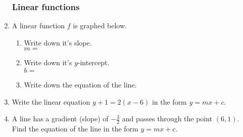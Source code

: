 \documentclass[12pt, twoside]{article}
\begin{document}
\begin{enumerate}
\newpage
\subsubsection*{Linear functions}
\item A linear function $f$ is graphed below.
    \begin{multicols}{2}
    \begin{enumerate}
      \item Write down it's slope.\\ $m=$
      \vspace{0.25cm}
      \item Write down it's $y$-intercept.\\ $b=$
      \vspace{0.25cm}
      \item Write down the equation of the line.
    \end{enumerate} \vspace{.5cm}
      \begin{center} 
      \end{center}
    \end{multicols} \vspace{1cm}
    
    \item Write the linear equation $y+1=2(x-6)$ in the form $y=mx+c$. \vspace{4cm}
    
    \item A line has a gradient (slope) of $\displaystyle -\frac{3}{2}$ and passes through the point $(6, 1)$. Find the equation of the line in the form $y=mx+c$.
    

\end{enumerate}
\end{document}
